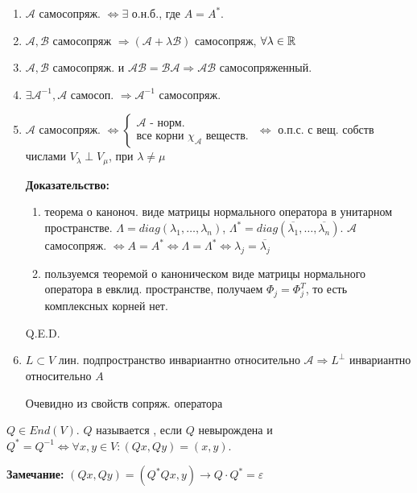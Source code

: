 \begin{enumerate}
    \item $\mathcal{A}$ самосопряж. $\Leftrightarrow \exists $ о.н.б., где $A = A^*$.
    \item $\mathcal{A}, \mathcal{B}$ самосопряж $\Rightarrow (\mathcal{A}+\lambda \mathcal{B})$ самосопряж, $\forall \lambda \in \mathbb{R}$
    \item $\mathcal{A},\mathcal{B}$ самосопряж. и $\mathcal{A}\mathcal{B}=\mathcal{BA}\Rightarrow \mathcal{AB}$ самосопряженный.
    \item $\exists \mathcal{A}^{-1},\mathcal{A}$ самосоп. $\Rightarrow \mathcal{A}^{-1}$ самосопряж.
    \item $\mathcal{A}$ самосопряж. $\Leftrightarrow \begin{cases}
        \mathcal{A} \text{ - норм.}\\
        \text{все корни $\chi_{\mathcal{A}}$ веществ.   }
    \end{cases} \Leftrightarrow$ о.п.с. с вещ. собств числами $V_\lambda \perp V_\mu$, при $\lambda\neq \mu$

    \textbf{Доказательство:}

    \begin{enumerate}
        \item теорема о каноноч. виде матрицы нормального оператора в унитарном пространстве. $\Lambda = diag (\lambda_1,\ldots, \lambda_n)$, $\Lambda^* = diag(\overline{\lambda_1},\ldots,\overline{\lambda_n})$. $\mathcal{A}$ самосопряж. $\Leftrightarrow A = A^* \Leftrightarrow \Lambda = \Lambda^* \Leftrightarrow \lambda_j = \overline{\lambda_j}$
        \item пользуемся теоремой о каноническом виде матрицы нормального оператора в евклид. пространстве, получаем $\Phi_j = \Phi_j^T$, то есть комплексных корней нет.
    \end{enumerate}

    \hfill Q.E.D.


    \item $L \subset V$ лин. подпространство инвариантно относительно $\mathcal{A} \Rightarrow L^\perp$ инвариантно относительно $A$

    Очевидно из свойств сопряж. оператора
\end{enumerate}


 $Q\in End(V)$. $Q$ называется , если $Q$ невырождена  и $Q^*=Q^{-1} \Leftrightarrow \forall x,y \in V: (Qx,Qy)= (x,y)$.

\textbf{Замечание:}  $(Qx,Qy) = (Q^*Qx,y) \rightarrow{ Q \cdot Q^* = \varepsilon}$


